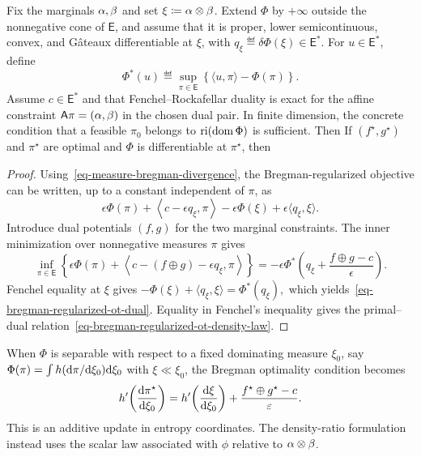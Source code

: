 \begin{prop}\label{prop-bregman-regularized-ot-dual}
Fix the marginals $\alpha,\beta$ and set $\xi\coloneqq\alpha\otimes\beta$. Extend $\Phi$ by $+\infty$ outside the nonnegative cone of $\mathsf E$, and assume that it is proper, lower semicontinuous, convex, and G\^ateaux differentiable at $\xi$, with $q_\xi\eqdef\delta\Phi(\xi)\in\mathsf E^*$. For $u\in\mathsf E^*$, define
\[
\Phi^*(u)
\eqdef
\sup_{\pi\in\mathsf E}
\left\{
\langle u,\pi\rangle-\Phi(\pi)
\right\}.
\]
Assume $c\in\mathsf E^*$ and that Fenchel--Rockafellar duality is exact for the affine constraint $\mathsf A\pi=(\alpha,\beta)$ in the chosen dual pair. In finite dimension, the concrete condition that a feasible $\pi_0$ belongs to $\operatorname{ri}(\operatorname{dom}\Phi)$ is sufficient. Then
If $(f^\star,g^\star)$ and $\pi^\star$ are optimal and $\Phi$ is differentiable at $\pi^\star$, then
\end{prop}
\begin{proof}
Using~\eqref{eq-measure-bregman-divergence}, the Bregman-regularized objective can be written, up to a constant independent of $\pi$, as
\[
\epsilon\Phi(\pi)
+
\left\langle c-\epsilon q_\xi,\pi\right\rangle
-\epsilon\Phi(\xi)+\epsilon\langle q_\xi,\xi\rangle.
\]
Introduce dual potentials $(f,g)$ for the two marginal constraints. The inner minimization over nonnegative measures $\pi$ gives
\[
\inf_{\pi\in\mathsf E}
\left\{
\epsilon\Phi(\pi)
+
\left\langle c-(f\oplus g)-\epsilon q_\xi,\pi\right\rangle
\right\}
=
-\epsilon
\Phi^*\!\left(
q_\xi+\frac{f\oplus g-c}{\epsilon}
\right).
\]
Fenchel equality at $\xi$ gives \(-\Phi(\xi)+\langle q_\xi,\xi\rangle = \Phi^*(q_\xi),\)
which yields~\eqref{eq-bregman-regularized-ot-dual}. Equality in Fenchel's inequality gives the primal--dual relation~\eqref{eq-bregman-regularized-ot-density-law}.
\end{proof}
When $\Phi$ is separable with respect to a fixed dominating measure $\xi_0$, say $\Phi(\pi)=\int h(\mathrm{d}\pi/\mathrm{d}\xi_0)\mathrm{d}\xi_0$ with $\xi\ll\xi_0$, the Bregman optimality condition becomes
\[
h'\!\left(\frac{\mathrm{d}\pi^\star}{\mathrm{d}\xi_0}\right)
=
h'\!\left(\frac{\mathrm{d}\xi}{\mathrm{d}\xi_0}\right)
+
\frac{f^\star\oplus g^\star-c}{\varepsilon}.
\]
This is an additive update in entropy coordinates. The density-ratio formulation instead uses the scalar law associated with $\phi$ relative to $\alpha\otimes\beta$.

